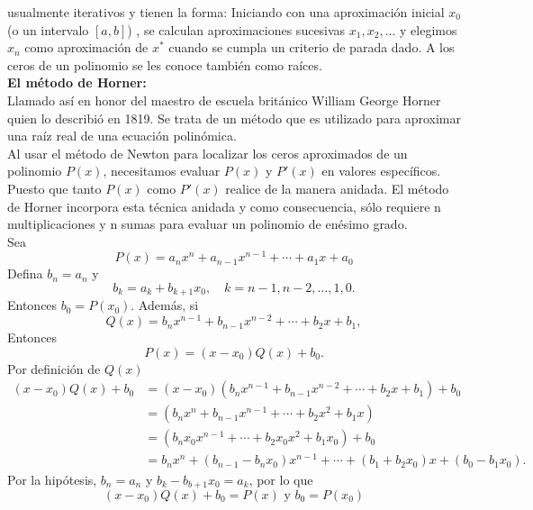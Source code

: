 \documentclass[12pt]{article}
\begin{document}
			usualmente iterativos y tienen la forma: Iniciando con una aproximación inicial $ x_0 $ (o un intervalo $ [a,b] $) , 
			se calculan aproximaciones sucesivas $ x_1,x_2,... $ y elegimos $ x_n $ como aproximación de $ x^* $ cuando se cumpla un 
			criterio de parada dado. A los ceros de un polinomio se les conoce también como raíces.\\
			\textbf{El método de Horner:}\\
			Llamado así en honor del maestro de escuela británico William George Horner quien lo describió 
			en 1819. Se trata de un método que es utilizado para aproximar una raíz real de una ecuación 
			polinómica.\cite{bib:item3} \\
			Al usar el método de Newton para localizar los ceros aproximados de un polinomio $ P(x) $, 
			necesitamos evaluar $ P(x) $ y $ P'(x) $ en valores específicos. Puesto que tanto $ P(x) $ 
			como $ P'(x) $ realice de la manera anidada. El método de Horner incorpora esta técnica 
			anidada y como consecuencia, sólo requiere n multiplicaciones y n sumas para evaluar un 
			polinomio de enésimo grado.\cite{bib:item4} \\
			Sea $$ P(x) = a_nx^n + a_{n-1}x^{n-1} + \cdots + a_1x + a_0 $$ 
			Defina $ b_n = a_n $ y $$ b_k = a_k +b_{k+1}x_0, \quad k = n-1, n-2,\ldots, 1, 0. $$
			Entonces $ b_0 = P(x_0) $. Además, si $$ Q(x) = b_nx^{n-1} + b_{n-1}x^{n-2} +\cdots+ b_2x + b_1, $$ 
			Entonces $$ P(x) = (x-x_0)Q(x) + b_0. $$
			Por definición de $ Q(x) $
			\begin{align*}
				(x-x_0)Q(x) + b_0 &= (x-x_0)(b_nx^{n-1} + b_{n-1}x^{n-2} +\cdots+ b_2x + b_1) + b_0 \\
				&= (b_nx^{n} + b_{n-1}x^{n-1} +\cdots+ b_2x^2 + b_1x) \\
				&= (b_nx_0x^{n-1} +\cdots+ b_2x_0x^2 + b_1x_0) + b_0 \\
				&= b_nx^n + (b_{n-1} - b_nx_0)x^{n-1} +\cdots+ (b_1 + b_2x_0)x + (b_0 -b_1x_0).
			\end{align*}
			Por la hipótesis, $ b_n = a_n $ y $ b_k - b_{b+1}x_0 = a_k $, por lo que
			$$ (x-x_0)Q(x) + b_0 = P(x)\text{ y }b_0 = P(x_0) $$
\end{document}
